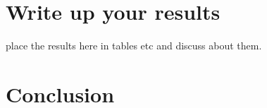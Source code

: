 \documentclass{sigchi}
\begin{document}

	


\section{Write up your results}
	place the results here in tables etc and discuss about them.

\section{Conclusion}
	 
	
	
\balance{}



\end{document}

